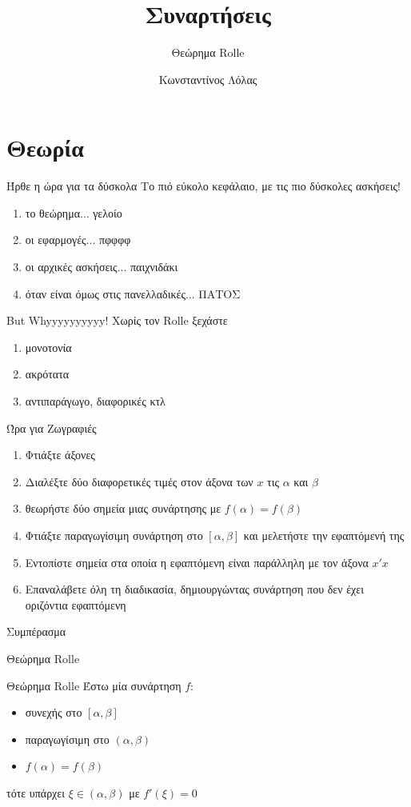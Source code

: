 \documentclass{presentation}
\title{Συναρτήσεις}
\subtitle{Θεώρημα Rolle}
\author[Λόλας]{Κωνσταντίνος Λόλας}
\begin{document}
\begin{frame}
  \titlepage
\end{frame}

\section{Θεωρία}
\begin{frame}{Ήρθε η ώρα για τα δύσκολα}
  Το πιό εύκολο κεφάλαιο, με τις πιο δύσκολες ασκήσεις!
  \begin{enumerate}
    \item<1-> το θεώρημα... γελοίο
    \item<2-> οι εφαρμογές... πφφφφ
    \item<3-> οι αρχικές ασκήσεις... παιχνιδάκι
    \item<4-> όταν είναι όμως στις πανελλαδικές... ΠΑΤΟΣ
  \end{enumerate}
\end{frame}

\begin{frame}{But Whyyyyyyyyyy!}
  Xωρίς τον Rolle ξεχάστε
  \begin{enumerate}
    \item<1-> μονοτονία
    \item<2-> ακρότατα
    \item<3-> αντιπαράγωγο, διαφορικές κτλ
  \end{enumerate}
\end{frame}

\begin{frame}{Ώρα για Ζωγραφιές}
  \begin{enumerate}
    \item<1-> Φτιάξτε άξονες
    \item<2-> Διαλέξτε δύο διαφορετικές τιμές στον άξονα των $x$ τις $α$ και $β$
    \item<3-> θεωρήστε δύο σημεία μιας συνάρτησης με $f(α)=f(β)$
    \item<4-> Φτιάξτε παραγωγίσιμη συνάρτηση στο $[α,β]$ και μελετήστε την εφαπτόμενή της
    \item<5-> Εντοπίστε σημεία στα οποία η εφαπτόμενη είναι παράλληλη με τον άξονα $x'x$
    \item<6-> Επαναλάβετε όλη τη διαδικασία, δημιουργώντας συνάρτηση που δεν έχει οριζόντια εφαπτόμενη
  \end{enumerate}
   Συμπέρασμα

\end{frame}

\begin{frame}{Θεώρημα Rolle}
  \begin{block}{Θεώρημα Rolle}
    Έστω μία συνάρτηση $f$:
    \begin{itemize}
      \item συνεχής στο $[α,β]$
      \item παραγωγίσιμη στο $(α,β)$
      \item $f(α)=f(β)$
    \end{itemize}
    τότε υπάρχει $ξ\in (α,β)$ με $f'(ξ)=0$
  \end{block}
\end{frame}
\end{document}
